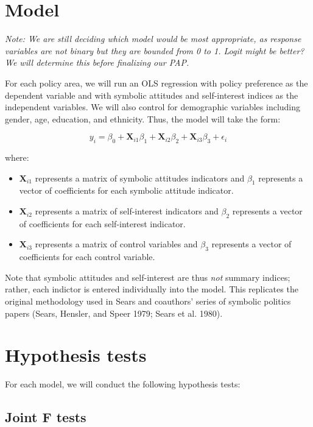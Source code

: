 \documentclass[]{article}
\begin{document}
\section{Model}\label{model}

\textit{Note: We are still deciding which model would be most appropriate, as response variables are not binary but they are bounded from 0 to 1. Logit might be better? We will determine this before finalizing our PAP.}

For each policy area, we will run an OLS regression with policy
preference as the dependent variable and with symbolic attitudes and
self-interest indices as the independent variables. We will also control
for demographic variables including gender, age, education, and
ethnicity. Thus, the model will take the form:

\begin{equation}
y_i = \beta_0 + \textbf{X}_{i1}\beta_1 + \textbf{X}_{i2}\beta_2 +  \textbf{X}_{i3}\beta_3 + \epsilon_i 
\end{equation}

where:

\begin{itemize}
  \item $\textbf{X}_{i1}$ represents a matrix of symbolic attitudes indicators and $\beta_1$ represents a vector of coefficients for each symbolic attitude indicator.
  \item $\textbf{X}_{i2}$ represents a matrix of self-interest indicators and $\beta_2$ represents a vector of coefficients for each self-interest indicator.
  \item $\textbf{X}_{i3}$ represents a matrix of control variables and $\beta_3$ represents a vector of coefficients for each control variable.
\end{itemize}

Note that symbolic attitudes and self-interest are thus \emph{not}
summary indices; rather, each indictor is entered individually into the
model. This replicates the original methodology used in Sears and
coauthors' series of symbolic politics papers (Sears, Hensler, and Speer
1979; Sears et al. 1980).

\section{Hypothesis tests}\label{hypothesis-tests}

For each model, we will conduct the following hypothesis tests:

\subsection{Joint F tests}\label{joint-f-tests}
\end{document}

